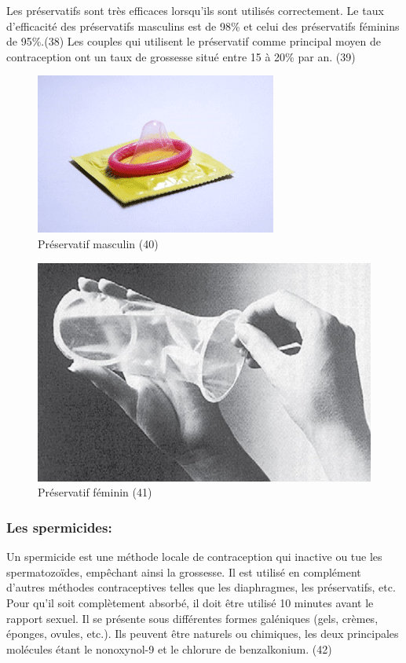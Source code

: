 \noindent Les préservatifs sont très efficaces lorsqu’ils sont utilisés correctement. Le taux d’efficacité des préservatifs masculins est de 98\% et celui des préservatifs féminins de 95\%.(38) Les couples qui utilisent le préservatif comme principal moyen de contraception ont un taux de grossesse situé entre 15 à 20\% par an. (39) 

\begin{figure}[H]
  \centering
  \includegraphics[scale=.7]{Images/fig_18b.jpg}
  \caption{Préservatif masculin (40)}
\end{figure}

\begin{figure}[H]
  \centering
  \includegraphics[scale=1]{Images/fig_19.jpg}
  \caption{Préservatif féminin (41)}
\end{figure}

\subsubsection{Les spermicides:}
\noindent Un spermicide est une méthode locale de contraception qui inactive ou tue les spermatozoïdes, empêchant ainsi la grossesse. Il est utilisé en complément d’autres méthodes contraceptives telles que les diaphragmes, les préservatifs, etc. Pour qu’il soit complètement absorbé, il doit être utilisé 10 minutes avant le rapport sexuel. Il se présente sous différentes formes galéniques (gels, crèmes, éponges, ovules, etc.). Ils peuvent être naturels ou chimiques, les deux principales molécules étant le nonoxynol-9 et le chlorure de benzalkonium. (42)\\

